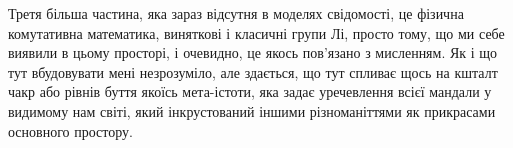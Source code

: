 Третя більша частина, яка зараз відсутня в моделях свідомості, це фізична
комутативна математика, виняткові і класичні групи Лі, просто тому, що ми
себе виявили в цьому просторі, і очевидно, це якось пов'язано з мисленням.
Як і що тут вбудовувати мені незрозуміло, але здається, що тут спливає щось
на кшталт чакр або рівнів буття якоїсь мета-істоти, яка задає уречевлення
всієї мандали у видимому нам світі, який інкрустований іншими різноманіттями
як прикрасами основного простору.

\normalsize
